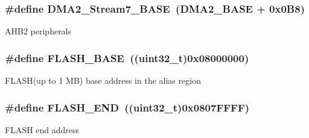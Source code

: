\subsubsection[{\texorpdfstring{D\+M\+A2\+\_\+\+Stream7\+\_\+\+B\+A\+SE}{DMA2_Stream7_BASE}}]{\setlength{\rightskip}{0pt plus 5cm}\#define D\+M\+A2\+\_\+\+Stream7\+\_\+\+B\+A\+SE~(D\+M\+A2\+\_\+\+B\+A\+SE + 0x0\+B8)}\hypertarget{group___peripheral__memory__map_gaa9faa708ad2440d24eb1064cba9bb06d}{}\label{group___peripheral__memory__map_gaa9faa708ad2440d24eb1064cba9bb06d}
A\+H\+B2 peripherals 
\subsubsection[{\texorpdfstring{F\+L\+A\+S\+H\+\_\+\+B\+A\+SE}{FLASH_BASE}}]{\setlength{\rightskip}{0pt plus 5cm}\#define F\+L\+A\+S\+H\+\_\+\+B\+A\+SE~((uint32\+\_\+t)0x08000000)}\hypertarget{group___peripheral__memory__map_ga23a9099a5f8fc9c6e253c0eecb2be8db}{}\label{group___peripheral__memory__map_ga23a9099a5f8fc9c6e253c0eecb2be8db}
F\+L\+A\+S\+H(up to 1 M\+B) base address in the alias region 
\subsubsection[{\texorpdfstring{F\+L\+A\+S\+H\+\_\+\+E\+ND}{FLASH_END}}]{\setlength{\rightskip}{0pt plus 5cm}\#define F\+L\+A\+S\+H\+\_\+\+E\+ND~((uint32\+\_\+t)0x0807\+F\+F\+F\+F)}\hypertarget{group___peripheral__memory__map_ga8be554f354e5aa65370f6db63d4f3ee4}{}\label{group___peripheral__memory__map_ga8be554f354e5aa65370f6db63d4f3ee4}
F\+L\+A\+SH end address 
